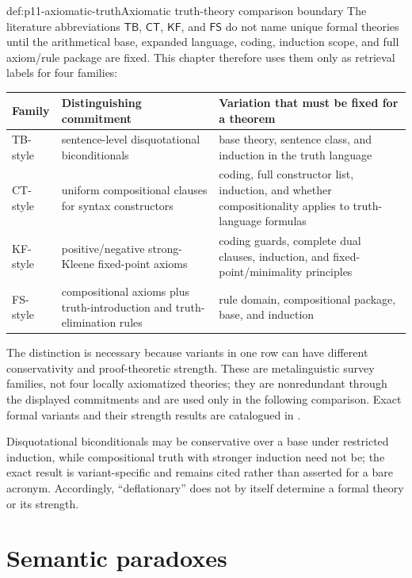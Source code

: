 \begin{proofboundary}{def:p11-axiomatic-truth}{Axiomatic truth-theory comparison boundary}
The literature abbreviations \(\mathsf{TB}\), \(\mathsf{CT}\),
\(\mathsf{KF}\), and \(\mathsf{FS}\) do not name unique formal theories until
the arithmetical base, expanded language, coding, induction scope, and full
axiom/rule package are fixed. This chapter therefore uses them only as
retrieval labels for four families:
\begin{center}
\begin{tabularx}{\textwidth}{@{}l X X@{}}
\toprule
Family & Distinguishing commitment & Variation that must be fixed for a theorem \\
\midrule
TB-style & sentence-level disquotational biconditionals & base theory, sentence class, and induction in the truth language \\
CT-style & uniform compositional clauses for syntax constructors & coding, full constructor list, induction, and whether compositionality applies to truth-language formulas \\
KF-style & positive/negative strong-Kleene fixed-point axioms & coding guards, complete dual clauses, induction, and fixed-point/minimality principles \\
FS-style & compositional axioms plus truth-introduction and truth-elimination rules & rule domain, compositional package, base, and induction \\
\bottomrule
\end{tabularx}
\end{center}
The distinction is necessary because variants in one row can have different
conservativity and proof-theoretic strength. These are metalinguistic survey
families, not four locally axiomatized theories; they are nonredundant through
the displayed commitments and are used only in the following comparison. Exact
formal variants and their strength results are catalogued in
\cite{Halbach2011}.
\end{proofboundary}

Disquotational biconditionals may be conservative over a base under restricted
induction, while compositional truth with stronger induction need not be; the
exact result is variant-specific and remains cited rather than asserted for a
bare acronym. Accordingly, ``deflationary'' does not by itself determine a
formal theory or its strength.

\section{Semantic paradoxes}
\label{sec:p11-paradoxes}

